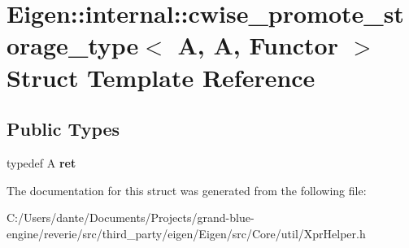 \hypertarget{struct_eigen_1_1internal_1_1cwise__promote__storage__type_3_01_a_00_01_a_00_01_functor_01_4}{}\section{Eigen\+::internal\+::cwise\+\_\+promote\+\_\+storage\+\_\+type$<$ A, A, Functor $>$ Struct Template Reference}
\label{struct_eigen_1_1internal_1_1cwise__promote__storage__type_3_01_a_00_01_a_00_01_functor_01_4}
\subsection*{Public Types}
\begin{DoxyCompactItemize}
\item 
\mbox{\label{struct_eigen_1_1internal_1_1cwise__promote__storage__type_3_01_a_00_01_a_00_01_functor_01_4_af5bbd8a7cba07b73aa5414da82810fdd}} 
typedef A {\bfseries ret}
\end{DoxyCompactItemize}


The documentation for this struct was generated from the following file\+:\begin{DoxyCompactItemize}
\item 
C\+:/\+Users/dante/\+Documents/\+Projects/grand-\/blue-\/engine/reverie/src/third\+\_\+party/eigen/\+Eigen/src/\+Core/util/Xpr\+Helper.\+h\end{DoxyCompactItemize}
